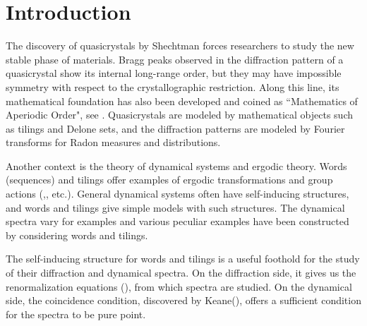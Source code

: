 \documentclass[a4]{amsart}
\theoremstyle{definition}
\begin{document}




\section{Introduction}
The discovery of quasicrystals by Shechtman \cite{Shechtman:84} forces researchers to study the new stable phase of materials. Bragg peaks observed in the diffraction pattern of a quasicrystal show its internal long-range order, but they may have impossible symmetry with respect to the crystallographic restriction.
Along this line, its mathematical foundation has also been developed and coined as ``Mathematics of Aperiodic Order", see \cite{Baake-Grimm:13}. 
Quasicrystals are modeled by mathematical objects such as tilings and Delone sets, and the diffraction patterns are modeled by Fourier transforms for Radon measures and distributions.

Another context is the theory
of dynamical systems and ergodic theory. Words (sequences) and tilings offer
examples of ergodic transformations and group actions (\cite{Ledrappier:92},\cite{Queffelec:87}, etc.). General dynamical systems often have self-inducing structures, and words
and tilings give simple models
with such structures.
The dynamical spectra vary
for examples and various
peculiar examples have
been constructed by considering
words and tilings.

The self-inducing structure
for words and tilings is a useful foothold for the study
of their diffraction and dynamical spectra.
On the diffraction side,
it gives us the renormalization equations (\cite{Manibo}), from
which spectra are studied. On the dynamical side, the coincidence condition, discovered by Keane(\cite{Keane:71, Sirvent-Solomyak:02}), offers a sufficient condition for the spectra to be pure point.
\end{document}
